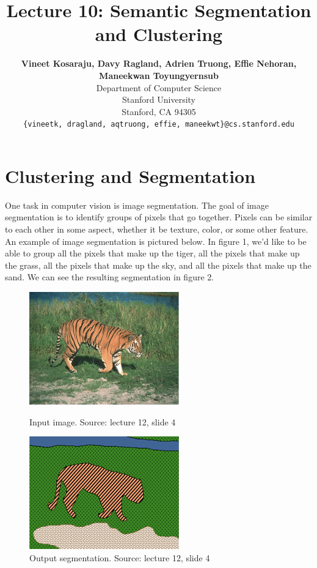 \documentclass{article}
\title{Lecture 10: Semantic Segmentation and Clustering}
\author{
  \textbf{Vineet Kosaraju, Davy Ragland, Adrien Truong, Effie Nehoran, Maneekwan Toyungyernsub} \\
  Department of Computer Science\\
  Stanford University\\
  Stanford, CA 94305 \\
  \texttt{\{vineetk, dragland, aqtruong, effie, maneekwt\}@cs.stanford.edu} \\
}
\begin{document}
\maketitle

\section{Clustering and Segmentation}
One task in computer vision is image segmentation. The goal of image segmentation is to identify groups of pixels that go together. Pixels can be similar to each other in some aspect, whether it be texture, color, or some other feature. An example of image segmentation is pictured below. In figure 1, we'd like to be able to group all the pixels that make up the tiger, all the pixels that make up the grass, all the pixels that make up the sky, and all the pixels that make up the sand. We can see the resulting segmentation in figure 2.

\begin{figure}[!htb]
   \begin{minipage}{0.48\textwidth}
     \centering
     \includegraphics[width=.7\linewidth]{tiger.png}
     \caption{Input image. Source: lecture 12, slide 4}
   \end{minipage}\hfill
   \begin {minipage}{0.48\textwidth}
     \centering
     \includegraphics[width=.7\linewidth]{tiger-segmented.png}
     \caption{Output segmentation. Source: lecture 12, slide 4}
   \end{minipage}
\end{figure}
\end{document}
